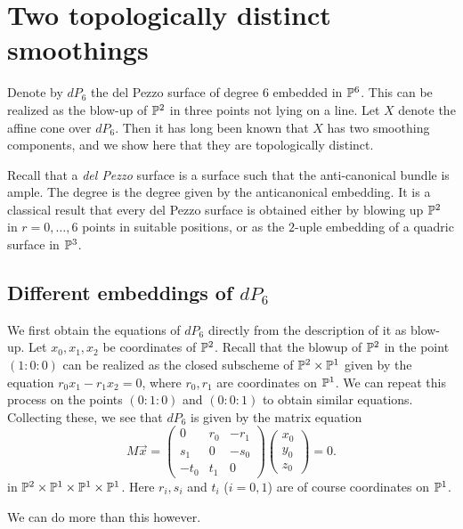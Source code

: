 \documentclass[]{uiophd}
\begin{document}


\chapter{Two topologically distinct smoothings}

Denote by $dP_6$ the del Pezzo surface of degree 6 embedded in $\mathbb{P}^6$. This can be realized as the blow-up of $\mathbb{P}^2$ in three points not lying on a line. Let $X$ denote the affine cone over $dP_6$. Then it has long been known that $X$ has two smoothing components, and we show here that they are topologically distinct.

Recall that a \emph{del Pezzo} surface is a surface such that the anti-canonical bundle is ample. The degree is the degree given by the anticanonical embedding. It is a classical result that every del Pezzo surface is obtained either by blowing up $\mathbb{P}^2$ in $r=0,\ldots,6$ points in suitable positions, or as the $2$-uple embedding of a quadric surface in $\mathbb{P}^3$. 

\section{Different embeddings of $dP_6$}

We first obtain the equations of $dP_6$ directly from the description of it as blow-up. Let $x_0,x_1,x_2$ be coordinates of $\mathbb{P}^2$. Recall that the blowup of $\mathbb{P}^2$ in the point $(1:0:0)$ can be realized as the closed subscheme of $\mathbb{P}^2 \times \mathbb{P}^1$ given by the equation $r_0x_1-r_1x_2=0$, where $r_0,r_1$ are coordinates on $\mathbb{P}^1$. We can repeat this process on the points $(0:1:0)$ and $(0:0:1)$ to obtain similar equations. Collecting these, we see that $dP_6$ is given by the matrix equation
\[
M\vec x = 
\begin{pmatrix}
0 & r_0 & -r_1 \\
s_1 & 0 & -s_0 \\
-t_0 & t_1 & 0
\end{pmatrix}
\begin{pmatrix}
x_0 \\ y_0 \\ z_0
\end{pmatrix}= 0.
\]
in $\mathbb{P}^2 \times \mathbb{P}^1 \times \mathbb{P}^1 \times \mathbb{P}^1$. Here $r_i,s_i$ and $t_i$ ($i=0,1$) are of course coordinates on $\mathbb{P}^1$.

We can do more than this however. 
\end{document}
